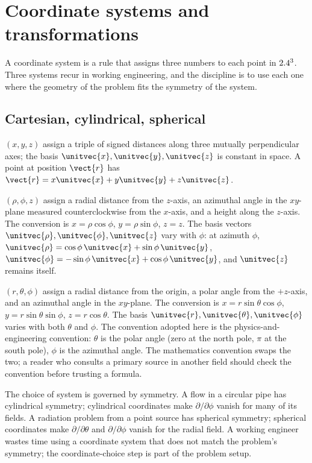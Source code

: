 \section{Coordinate systems and transformations}

A coordinate system is a rule that assigns three numbers to each
point in $2.4^{3}$. Three systems recur in working engineering, and the
discipline is to use each one where the geometry of the problem fits
the symmetry of the system.

\subsection{Cartesian, cylindrical, spherical}

 $(x, y, z)$ assign a triple of signed
distances along three mutually perpendicular axes; the basis
$\unitvec{x}, \unitvec{y}, \unitvec{z}$ is constant in space. A point
at position $\vect{r}$ has $\vect{r} = x\unitvec{x} + y\unitvec{y} +
z\unitvec{z}$.

 $(\rho, \phi, z)$ assign a radial
distance from the $z$-axis, an azimuthal angle in the $xy$-plane
measured counterclockwise from the $x$-axis, and a height along the
$z$-axis. The conversion is $x = \rho\cos\phi$, $y = \rho\sin\phi$,
$z = z$. The basis vectors $\unitvec{\rho}, \unitvec{\phi},
\unitvec{z}$ vary with $\phi$: at azimuth $\phi$, $\unitvec{\rho} =
\cos\phi\,\unitvec{x} + \sin\phi\,\unitvec{y}$, $\unitvec{\phi} =
-\sin\phi\,\unitvec{x} + \cos\phi\,\unitvec{y}$, and $\unitvec{z}$
remains itself.

 $(r, \theta, \phi)$ assign a radial
distance from the origin, a polar angle from the $+z$-axis, and an
azimuthal angle in the $xy$-plane. The conversion is $x = r\sin\theta
\cos\phi$, $y = r\sin\theta\sin\phi$, $z = r\cos\theta$. The basis
$\unitvec{r}, \unitvec{\theta}, \unitvec{\phi}$ varies with both
$\theta$ and $\phi$. The convention adopted here is the
physics-and-engineering convention: $\theta$ is the polar angle (zero
at the north pole, $\pi$ at the south pole), $\phi$ is the azimuthal
angle. The mathematics convention swaps the two; a reader who consults
a primary source in another field should check the convention before
trusting a formula.

The choice of system is governed by symmetry. A flow in a circular
pipe has cylindrical symmetry; cylindrical coordinates make
$\partial / \partial \phi$ vanish for many of its fields. A radiation
problem from a point source has spherical symmetry; spherical
coordinates make $\partial / \partial \theta$ and $\partial /
\partial \phi$ vanish for the radial field. A working engineer
wastes time using a coordinate system that does not match the
problem's symmetry; the coordinate-choice step is part of the
problem setup.

